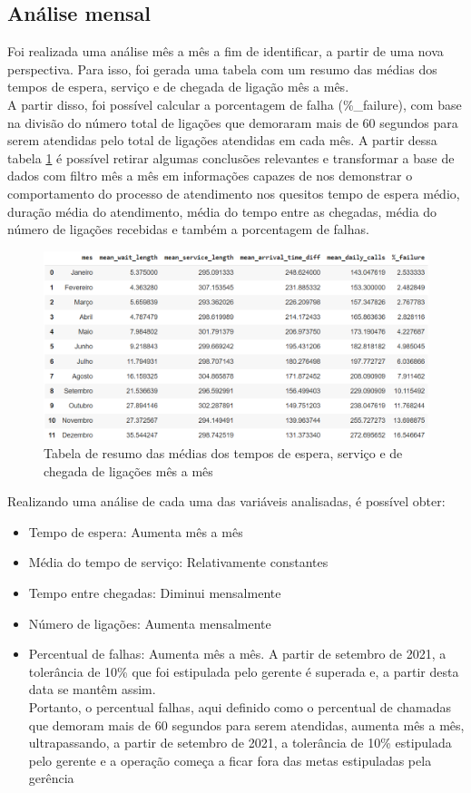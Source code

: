 \subsection{Análise mensal}
Foi realizada uma análise mês a mês a fim de identificar, a partir de uma nova perspectiva. Para isso, foi gerada uma tabela com um resumo das médias dos tempos de espera, serviço e de chegada de ligação mês a mês.\\
A partir disso, foi possível calcular a porcentagem de falha (\%\_failure), com base na divisão do número total de ligações que demoraram mais de 60 segundos para serem atendidas pelo total de ligações atendidas em cada mês. 
A partir dessa tabela \ref*{fig: tmes} é possível retirar algumas conclusões relevantes e transformar a base de dados com filtro mês a mês em informações capazes de nos demonstrar o comportamento do processo de atendimento nos quesitos tempo de espera médio, duração média do atendimento, média do tempo entre as chegadas, média do número de ligações recebidas e também a porcentagem de falhas.  
\begin{figure}[H]
    \includegraphics[scale=0.7]{analise-de-dados/mensal/tabmens.png}
    \caption{Tabela de resumo das médias dos tempos de espera, serviço e de chegada de ligações mês a mês}
    \label{fig: tmes}
\end{figure}

Realizando uma análise de cada uma das variáveis analisadas, é possível obter:
\begin{itemize}
    \item Tempo de espera: Aumenta mês a mês
    \item Média do tempo de serviço: Relativamente constantes
    \item Tempo entre chegadas: Diminui mensalmente
    \item Número de ligações: Aumenta mensalmente
    \item Percentual de falhas: Aumenta mês a mês. A partir de setembro de 2021, a tolerância de 10\% que foi estipulada pelo
     gerente é superada e, a partir desta data se mantêm assim.\\
Portanto, o percentual falhas, aqui definido como o percentual de chamadas que demoram mais de 60 segundos para serem atendidas, aumenta mês a mês, ultrapassando, a partir de setembro de 2021,
a tolerância de 10\% estipulada pelo gerente e a operação começa a ficar fora das metas estipuladas pela gerência
\end{itemize}